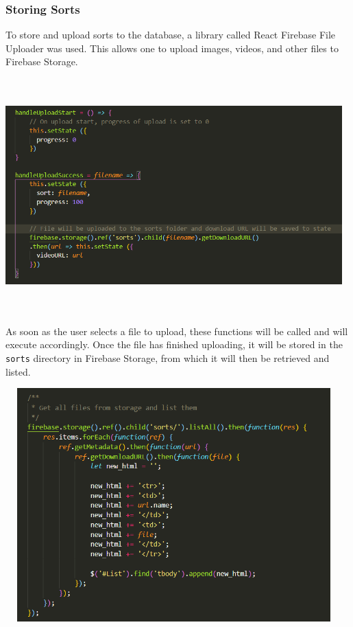 \subsubsection{Storing Sorts}
To store and upload sorts to the database, a library called React Firebase File Uploader \cite{file_uploader} was used. This allows one to upload images, videos, and other files to Firebase Storage. 

\begin{center}
    \includegraphics[width=13cm,height=9cm,keepaspectratio]{images/uploadsort}
\end{center}
As soon as the user selects a file to upload, these functions will be called and will execute accordingly. Once the file has finished uploading, it will be stored in the \lstinline{sorts} directory in Firebase Storage, from which it will then be retrieved and listed.

\newpage
\begin{center}
    \includegraphics[width=13cm,height=9cm,keepaspectratio]{images/storesorts}
\end{center}

